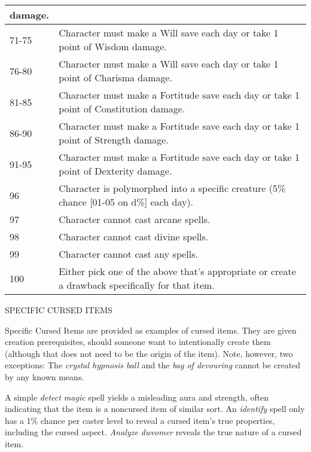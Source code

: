 \documentclass{article}
\begin{document}
\begin{tabular}{|>{\raggedright}p{22pt}|>{\raggedright}p{304pt}|}
damage.\tabularnewline
\hline
71-75 & Character must make a Will save each day or take 1 point of Wisdom damage.\tabularnewline
\hline
76-80 & Character must make a Will save each day or take 1 point of Charisma damage.\tabularnewline
\hline
81-85 & Character must make a Fortitude save each day or take 1 point of Constitution 
damage.\tabularnewline
\hline
86-90 & Character must make a Fortitude save each day or take 1 point of Strength 
damage.\tabularnewline
\hline
91-95 & Character must make a Fortitude save each day or take 1 point of Dexterity 
damage.\tabularnewline
\hline
96 & Character is polymorphed into a specific creature (5\% chance [01-05 on d\%] 
each day).\tabularnewline
\hline
97 & Character cannot cast arcane spells.\tabularnewline
\hline
98 & Character cannot cast divine spells.\tabularnewline
\hline
99 & Character cannot cast any spells.\tabularnewline
\hline
100 & Either pick one of the above that's appropriate or create a drawback specifically 
for that item.\tabularnewline
\hline
\end{tabular}

\vspace{12pt}
SPECIFIC CURSED ITEMS

Specific Cursed Items are provided as examples of cursed items. They are given 
creation prerequisites, should someone want to intentionally create them (although 
that does not need to be the origin of the item). Note, however, two exceptions: 
The \textit{crystal hypnosis ball }and the \textit{bag of devouring }cannot be 
created by any known means.

A simple \textit{detect magic }spell yields a misleading aura and strength, often 
indicating that the item is a noncursed item of similar sort. An \textit{identify 
}spell only has a 1\% chance per caster level to reveal a cursed item's true properties, 
including the cursed aspect. \textit{Analyze dweomer }reveals the true nature of 
a cursed item.
\end{document}
